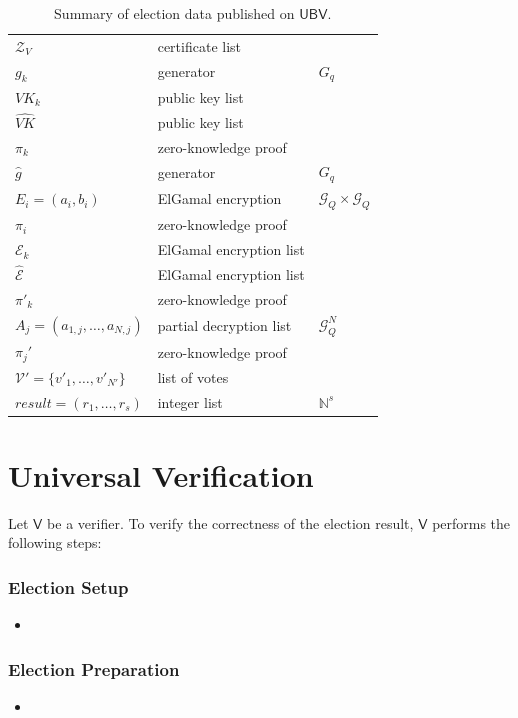 \documentclass[bibtotoc,halfparskip,oneside]{scrreprt}
\newcommand{\Verifier}{\ensuremath{\mathsf{V}}\xspace}
\newcommand{\UBV}{\ensuremath{\mathsf{UBV}}\xspace}
\begin{document}
\begin{table}[ht]
\begin{center}
\begin{tabular}{l|l|l}
$\mathcal{Z}_{V}$ & certificate list & \\
$g_k$ & generator & $G_q$ \\
$\mathit{VK}_k$ & public key list & \\
$\hat{\mathit{VK}}$  & public key list & \\
$\pi_k$ & zero-knowledge proof & \\
$\hat{g}$ & generator & $G_q$ \\
$E_i=(a_i,b_i)$ & ElGamal encryption & $\mathcal{G}_Q\times\mathcal{G}_Q$\\
$\pi_i$ & zero-knowledge proof & \\
$\mathcal{E}_k$ & ElGamal encryption list & \\
$\hat{\mathcal{E}}$ & ElGamal encryption list & \\
$\pi'_{k}$ & zero-knowledge proof & \\
$A_j= (a_{1,j},\ldots,a_{N,j})$ & partial decryption list & $\mathcal{G}_Q^N$ \\
$\pi_{j}'$ & zero-knowledge proof & \\ 
$\mathcal{V}'=\{v'_1,\ldots,v'_{N'}\}$ & list of votes & \\
$\mathit{result}=(r_1,\ldots,r_s)$ & integer list & $\mathbb{N}^s$\\
\end{tabular}
\caption{Summary of election data published on \UBV.}
\end{center}
\end{table}

\section{Universal Verification}

Let \Verifier be a verifier. To verify the correctness of the election result, \Verifier performs the following steps:

\subsubsection{Election Setup}
\begin{itemize}
	\item 
\end{itemize}

\subsubsection{Election Preparation}
\begin{itemize}
	\item 
\end{itemize}
\end{document}
